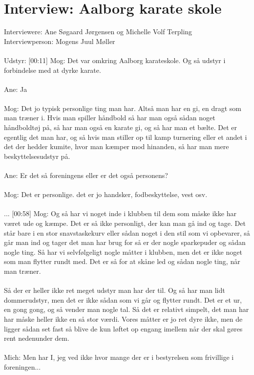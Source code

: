 \chapter{Interview: Aalborg karate skole}\label{ch:appElabel}
Interviewere: Ane Søgaard Jørgensen og Michelle Volf Terpling\\
Interviewperson: Mogens Juul Møller
\\\\
Udstyr:
[00:11]
Mog: Det var omkring Aalborg karateskole. Og så udstyr i forbindelse med at dyrke karate.
\\\\
Ane: Ja
\\\\
Mog: Det jo typisk personlige ting man har. Altså man har en gi, en dragt som man træner i. Hvis man spiller håndbold så har man også sådan noget håndboldtøj på, så har man også en karate gi, og så har man et bælte. Det er egentlig det man har, og så hvis man stiller op til kamp turnering eller et andet i det der hedder kumite, hvor man kæmper mod hinanden, så har man mere beskyttelsesudstyr på. 
\\\\
Ane: Er det så foreningens eller er det også personens? 
\\\\
Mog: Det er personlige. det er jo handsker, fodbeskyttelse, vest osv.
\\\\
...
[00:58]
Mog: Og så har vi noget inde i klubben til dem som måske ikke har været ude og kæmpe. Det er så ikke personligt, der kan man gå ind og tage. Det står bare i en stor snavstaskekurv eller sådan noget i den stil som vi opbevarer, så går man ind og tager det man har brug for så er der nogle sparkepuder og sådan nogle ting. Så har vi selvfølgeligt nogle måtter i klubben, men det er ikke noget som man flytter rundt med. Det er så for at skåne led og sådan nogle ting, når man træner.
\\\\
Så der er heller ikke ret meget udstyr man har der til.
Og så har man lidt dommerudstyr, men det er ikke sådan som vi går og flytter rundt. Det er et ur, en gong gong, og så vender man nogle tal. Så det er relativt simpelt, det man har har måske heller ikke en så stor værdi. 
Vores måtter er jo ret dyre ikke, men de ligger sådan set fast så blive de kun løftet op engang imellem når der skal gøres rent nedenunder dem.
\\\\
Mich: Men har I, jeg ved ikke hvor mange der er i bestyrelsen som frivillige i foreningen...
